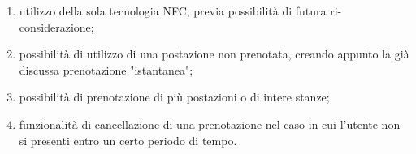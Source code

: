 \begin{enumerate}
    \item utilizzo della sola tecnologia NFC, previa possibilità di futura ri-considerazione;
    \item possibilità di utilizzo di una postazione non prenotata, creando appunto la già discussa prenotazione "istantanea";
    \item possibilità di prenotazione di più postazioni o di intere stanze;
    \item funzionalità di cancellazione di una prenotazione nel caso in cui l'utente non si presenti entro un certo periodo di tempo.
\end{enumerate}
